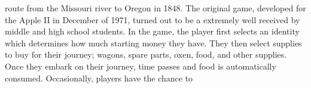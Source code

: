 route from the Missouri river to Oregon in 1848. The original game, developed for the Apple II in December of 1971, turned out to be a extremely well received by middle and high school students. In the game, the player first selects an identity which determines how much starting money they have. They then select supplies to buy for their journey; wagons, spare parts, oxen, food, and other supplies. Once they embark on their journey, time passes and food is automatically consumed. Occasionally, players have the chance to 